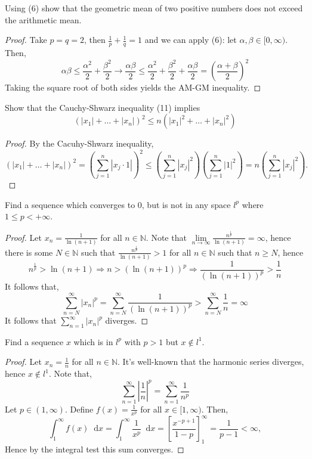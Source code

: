 \documentclass[12pt]{article}
\newcommand{\N}{\mathbb{N}}
\newcommand{\Lim}{\lim\limits}
\newcommand*\dif{\mathop{}\!\mathrm{d}}
\newenvironment{exercise}[2][Exercise]{\begin{trivlist}
\item[\hskip \labelsep {\bfseries #1}\hskip \labelsep {\bfseries #2.}]}{\end{trivlist}}
\begin{document}
\begin{exercise}{1.2.2}
    Using (6) show that the geometric mean of two positive numbers does not exceed the arithmetic mean.
\end{exercise}
\begin{proof}
    Take $p = q = 2$, then $\frac{1}{p} + \frac{1}{q} =1$ and we can apply (6): let $\alpha, \beta \in [0, \infty)$. Then,
    \[ \alpha \beta \leq \frac{\alpha^2}{2} + \frac{\beta^2}{2}   \rightarrow \frac{\alpha \beta}{2} \leq \frac{\alpha^2}{2} + \frac{\beta^2}{2} + \frac{\alpha \beta}{2} = \left ( \frac{\alpha + \beta}{2} \right)^2    \]
    Taking the square root of both sides yields the AM-GM inequality.
\end{proof}

\begin{exercise}{1.2.3}
    Show that the Cauchy-Shwarz inequality (11) implies
    \[ (|x_1| + \ldots + |x_n|)^2 \leq n(|x_1|^2 + \ldots + |x_n|^2) \]
\end{exercise}
\begin{proof}
    By the Cacuhy-Shwarz inequality,
    \[ (|x_1| + \ldots + |x_n|)^2  = \left (\sum_{j=1}^{n} |x_j \cdot 1| \right)^2 \leq \left (\sum_{j=1}^{n} |x_j|^2 \right) \left ( \sum_{j=1}^{n} |1|^{2} \right) = n \left (\sum_{j=1}^{n} |x_j|^2 \right).  \]
\end{proof}

\begin{exercise}{1.2.4}
    Find a sequence which converges to $0$, but is not in any space $l^p$ where $1 \leq p < +\infty$.
\end{exercise}
\begin{proof}
    Let $x_n = \frac{1}{\ln (n+1)}$ for all $n \in \N$. Note that $\Lim_{n \to \infty} \frac{n^{\frac{1}{p}}}{\ln (n+1)} = \infty$, hence there is some $N \in \N$ such that $\frac{n^{\frac{1}{p}}}{\ln (n+1)} > 1$ for all $n \in \N$ such that $n \geq N$, hence 
    \[ n^{\frac{1}{p}} > \ln (n+1) \Rightarrow n > (\ln (n+1))^{p} \Rightarrow \frac{1}{(\ln (n+1))^{p}} > \frac{1}{n}   \]
    It follows that,
    \[ \sum_{n=N}^{\infty} |x_n|^{p} = \sum_{n=N}^{\infty} \frac{1}{(\ln(n+1))^{p}} > \sum_{n=N}^{\infty} \frac{1}{n} = \infty \]
    It follows that $\sum_{n=1}^{\infty} |x_n|^{p} $ diverges.
\end{proof}

\begin{exercise}{1.2.5}
    Find a sequence $x$ which is in $l^{p}$ with $p > 1$ but $x \notin l^{1}$.
\end{exercise}
\begin{proof}
    Let $x_n = \frac{1}{n}$ for all $n \in \N$. It's well-known that the harmonic series diverges, hence $x \notin l^{1}$. Note that,
    \[ \sum_{n=1}^{\infty} \left | \frac{1}{n} \right|^{p} = \sum_{n=1}^{\infty} \frac{1}{n^{p}}   \]
    Let $p \in (1, \infty)$. Define $f(x) = \frac{1}{x^{p}}$ for all $x \in [1, \infty)$. Then,
    \[ \int_{1}^{\infty} f(x) \dif x = \int_1^{\infty} \frac{1}{x^p} \dif x = \left [ \frac{x^{-p+1}}{1-p} \right ]_{1}^{\infty} = \frac{1}{p-1} < \infty,   \]
    Hence by the integral test this sum converges.
\end{proof}
\end{document}
